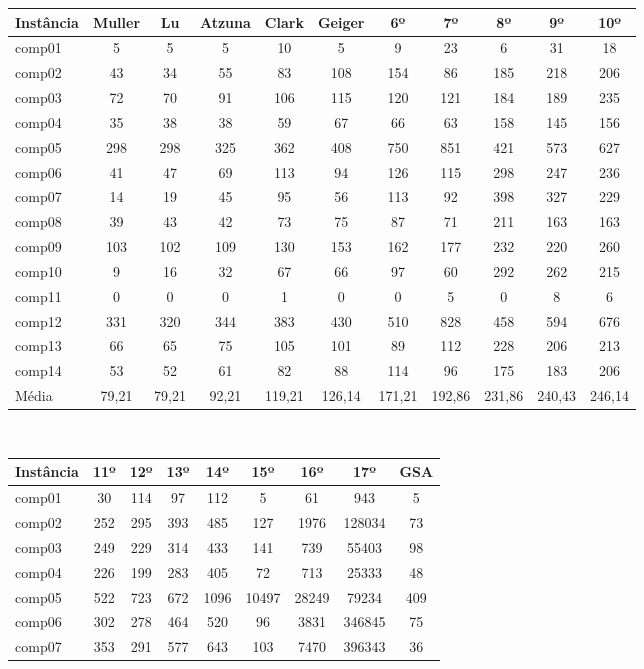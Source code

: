 \documentclass[11pt]{article}
\begin{document}
\begin{table}[htbf]
\begin{center}
\begin{footnotesize}
\begin{tabular}{|l|c|c|c|c|c|c|c|c|c|c|}
\hline
Instância &	Muller & Lu & Atzuna & Clark & Geiger & 6º & 7º & 8º & 9º & 10º \\ \hline
comp01&5&5&5&10&5&9&23&6&31&18 \\
comp02&43&34&55&83&108&154&86&185&218&206 \\
comp03&72&70&91&106&115&120&121&184&189&235 \\
comp04&35&38&38&59&67&66&63&158&145&156 \\
comp05&298&298&325&362&408&750&851&421&573&627 \\
comp06&41&47&69&113&94&126&115&298&247&236\\
comp07&14&19&45&95&56&113&92&398&327&229\\
comp08&39&43&42&73&75&87&71&211&163&163\\
comp09&103&102&109&130&153&162&177&232&220&260\\
comp10&9&16&32&67&66&97&60&292&262&215\\
comp11&0&0&0&1&0&0&5&0&8&6\\
comp12&331&320&344&383&430&510&828&458&594&676\\
comp13&66&65&75&105&101&89&112&228&206&213\\
comp14&53&52&61&82&88&114&96&175&183&206\\ \hline
Média&79,21&79,21&92,21&119,21&126,14&171,21&192,86&231,86&240,43&246,14\\ \hline
\end{tabular}
\end{footnotesize}
\\
\medskip
\begin{footnotesize}
\begin{tabular}{|l|c|c|c|c|c|c|c||c|}
\hline
Instância & 11º & 12º & 13º & 14º & 15º & 16º & 17º & GSA \\ \hline
comp01&30&114&97&112&5&61&943&5 \\
comp02&252&295&393&485&127&1976&128034&73\\
comp03&249&229&314&433&141&739&55403&98\\
comp04&226&199&283&405&72&713&25333&48\\
comp05&522&723&672&1096&10497&28249&79234&409\\
comp06&302&278&464&520&96&3831&346845&75\\
comp07&353&291&577&643&103&7470&396343&36\\

\end{tabular}
\end{footnotesize}
\end{center}
\end{table}
\end{document}
